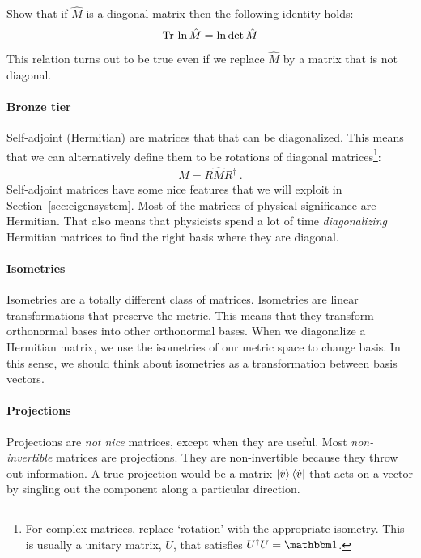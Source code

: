\documentclass[12pt]{article}
\begin{document}
\begin{exercise}
Show that if $\hat M$ is a diagonal matrix then the following identity holds:
\begin{align}
\textnormal{Tr}\, \ln \hat M = \ln \det \hat M
\label{eq:tr:log:M:eq:ln:det:M:diag}
\end{align}
This relation turns out to be true even if we replace $\hat M$ by a matrix that is not diagonal.
\end{exercise}



\paragraph{Bronze tier} Self-adjoint (Hermitian) are matrices that that can be diagonalized. This means that we can alternatively define them to be rotations of diagonal matrices\footnote{For complex matrices, replace `rotation' with the appropriate isometry. This is usually a unitary matrix, $U$, that satisfies $U^\dag U = \one$.}:
\begin{align}
    M = R \hat M R^\dag \ .
\end{align}
Self-adjoint matrices have some nice features that we will exploit in Section~\ref{sec:eigensystem}. Most of the matrices of physical significance are Hermitian. That also means that physicists spend a lot of time \emph{diagonalizing} Hermitian matrices to find the right basis where they are diagonal.


\paragraph{Isometries} Isometries are a totally different class of matrices. Isometries are linear transformations that preserve the metric. This means that they transform orthonormal bases into other orthonormal bases. When we diagonalize a Hermitian matrix, we use the isometries of our metric space to change basis. In this sense, we should think about isometries as a transformation between basis vectors. 

\paragraph{Projections} Projections are \emph{not nice} matrices, except when they are useful. Most \emph{non-invertible} matrices are projections. They are non-invertible because they throw out information. A true projection would be a matrix $\left|\hat{v}\right\rangle\left\langle\hat{v}\right|$ that acts on a vector by singling out the component along a particular direction. 
\end{document}
